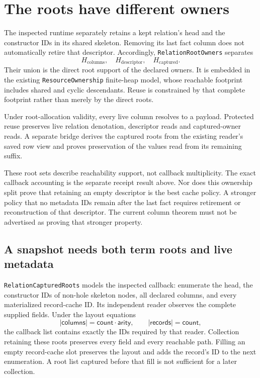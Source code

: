 \documentclass[11pt,a4paper]{article}
\newcommand{\code}[1]{\nolinkurl{#1}}
\begin{document}
\section{The roots have different owners}

The inspected runtime separately retains a kept relation's head and the
constructor IDs in its shared skeleton. Removing its last fact column does
not automatically retire that descriptor. Accordingly,
\code{RelationRootOwners} separates
\[
 H_{\mathrm{columns}},\quad H_{\mathrm{descriptor}},\quad
 H_{\mathrm{captured}}.
\]
Their union is the direct root support of the declared owners. It is embedded
in the existing \code{ResourceOwnership} finite-heap model, whose reachable
footprint includes shared and cyclic descendants. Reuse is constrained by
that complete footprint rather than merely by the direct roots.

Under root-allocation validity, every live column resolves to a payload.
Protected reuse preserves live relation denotation, descriptor reads and
captured-owner reads. A separate bridge derives the captured roots from the
existing reader's saved row view and proves preservation of the values read
from its remaining suffix.

These root sets describe reachability support, not callback multiplicity.
The exact callback accounting is the separate receipt result above.
Nor does this ownership split prove that retaining an empty descriptor is
the best cache policy. A stronger policy that no metadata IDs remain after
the last fact requires retirement or reconstruction of that descriptor.
The current column theorem must not be advertised as proving that stronger
property.

\subsection{A snapshot needs both term roots and live metadata}

\code{RelationCapturedRoots} models the inspected callback: enumerate the
head, the constructor IDs of non-hole skeleton nodes, all declared columns,
and every materialized record-cache ID. Its independent reader observes the
complete supplied fields. Under the layout equations
\[
 |\mathsf{columns}|=\mathsf{count}\cdot\mathsf{arity},\qquad
 |\mathsf{records}|=\mathsf{count},
\]
the callback list contains exactly the IDs required by that reader.
Collection retaining these roots preserves every field and every reachable
path. Filling an empty record-cache slot preserves the layout and adds the
record's ID to the next enumeration. A root list captured before that fill
is not sufficient for a later collection.
\end{document}
